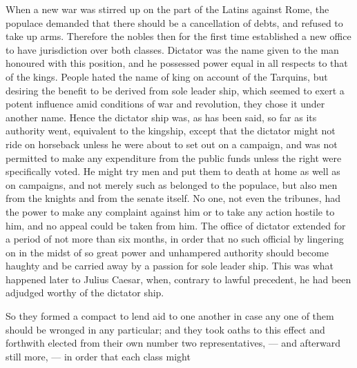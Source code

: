 When a new war was stirred up on the part of the Latins against Rome, the populace demanded that there should be a cancellation of debts, and refused to take up arms. Therefore the nobles then for the first time established a new office to have jurisdiction over both classes. Dictator was the name given to the man honoured with this position, and he possessed power equal in all respects to that of the kings. People hated the name of king on account of the Tarquins, but desiring the benefit to be derived from sole leader ­ship, which seemed to exert a potent influence amid conditions of war and revolution, they chose it under another name. Hence the dictator ­ship was, as has been said, so far as its authority went, equivalent to the kingship, except that the dictator might not ride on horseback unless he were about to set out on a campaign, and was not permitted to make any expenditure from the public funds unless the right were specifically voted. He might try men and put them to death at home as well as on campaigns, and not merely such as belonged to the populace, but also men from the knights and from the senate itself. No one, not even the tribunes, had the power to make any complaint against him or to take any action hostile to him, and no appeal could be taken from him. The office of dictator extended for a period of not more than six months, in order that no such official by lingering on in the midst of so great power and unhampered authority should become haughty and be carried away by a passion for sole leader ­ship. This was what happened later to Julius Caesar, when, contrary to lawful precedent, he had been adjudged worthy of the dictator ­ship.

So they formed a compact to lend aid to one another in case any one of them should be wronged in any particular; and they took oaths to this effect and forthwith elected from their own number two representatives, \texthebrew{—} and afterward still more, \texthebrew{—} in order that each class might

